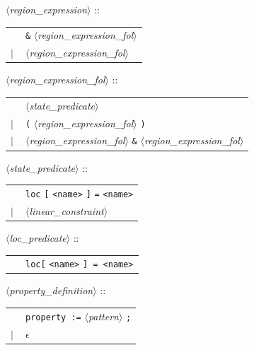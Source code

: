 \documentclass[a4paper,11pt]{report}
\newcommand{\emptystring}{$\epsilon$}
\newcommand{\nt}[1]{$\langle$\emph{#1}$\rangle$}
\newcommand{\regleGrammaire}[1]{\bigskip \noindent \nt{#1} :: \\}
\newcommand{\styleIMI}[1]{\textcolor{imicolor}{\texttt{#1}}}
\begin{document}
\regleGrammaire{region\_expression}
\begin{tabular}{l l}
	\  & \styleIMI{\&} \nt{region\_expression\_fol}\\
	$|$ & \nt{region\_expression\_fol}\\
\end{tabular}

\regleGrammaire{region\_expression\_fol}
\begin{tabular}{l l}
	\  & \nt{state\_predicate} \\
	$|$ & \styleIMI{(} \nt{region\_expression\_fol} \styleIMI{)} \\
	$|$ & \nt{region\_expression\_fol} \styleIMI{\&} \nt{region\_expression\_fol} \\
\end{tabular}


\regleGrammaire{state\_predicate}
\begin{tabular}{l l}
	\  & \styleIMI{loc} \styleIMI{[} \styleIMI{<name>} \styleIMI{]} \styleIMI{=} \styleIMI{<name>} \\
	$|$ & \nt{linear\_constraint} \\
\end{tabular}

\regleGrammaire{loc\_predicate}
\begin{tabular}{l l}
	\  & \styleIMI{loc[} \styleIMI{<name>} \styleIMI{] = \styleIMI{<name>}} \\
\end{tabular}






\regleGrammaire{property\_definition}
\begin{tabular}{l l}
	\  & \styleIMI{property :=} \nt{pattern} \styleIMI{;} \\
	$|$ & \emptystring \\
\end{tabular}
\end{document}
